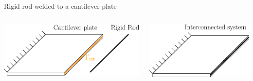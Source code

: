 \documentclass[aspectratio=169]{ISAE-Beamer}
\begin{document}
\begin{frame}{Rigid rod welded to a cantilever plate }
\begin{columns}
\begin{column}{.57\textwidth}
\begin{tcolorbox}
	\centering
	\includegraphics[height=0.355\textheight]{presentation/plate_rod_separated.eps}
\end{tcolorbox}
\end{column}

\begin{column}{.43\textwidth}
\begin{tcolorbox}
	\centering
	\includegraphics[height=0.355\textheight]{presentation/plate_rod_welded.eps}
\end{tcolorbox}	
\end{column}
\end{columns}


\end{frame}
\end{document}
